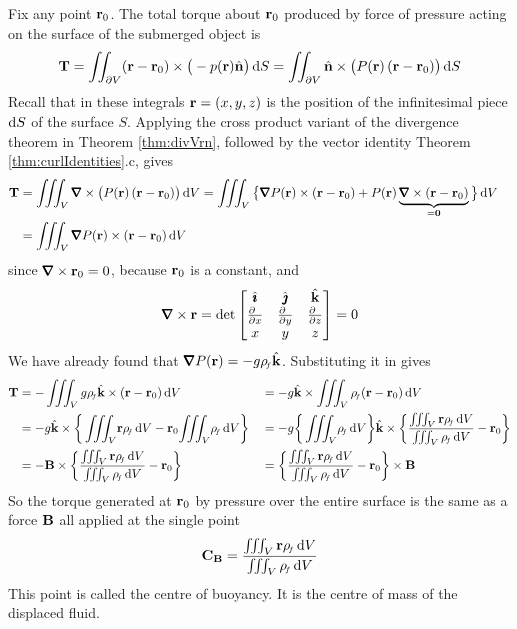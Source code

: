 Fix any point $\mathbf{r}_0$. The total torque about $\mathbf{r}_0$ produced by 
force of pressure acting on the surface of the submerged object is
\begin{equation*}
\mathbf{T}=\iint_{\partial V} (\mathbf{r}-\mathbf{r}_0)\times\big(-p(\mathbf{r})\hat{\mathbf{n}}\big)\,\mathrm{d}S
=\iint_{\partial V} \hat{\mathbf{n}}\times\big(P(\mathbf{r})\, (\mathbf{r}-\mathbf{r}_0)\big)\,\mathrm{d}S
\end{equation*}
Recall that in these integrals $\mathbf{r}=(x,y,z)$ is the position of the 
infinitesimal piece $\mathrm{d}S$ of the surface $S$.
Applying the cross product variant of the divergence theorem in Theorem
\ref{thm:divVrn}, followed by the vector identity 
Theorem \ref{thm:curlIdentities}.c, gives
\begin{align*}
\vT&=\tripInt_V \vnabla\times\big(P(\vr)\,(\vr-\vr_0)\big)\,\dee{V}
=\tripInt_V \big\{\vnabla P(\vr)\times(\vr-\vr_0)
     +P(\vr)\underbrace{\vnabla\times(\vr-\vr_0)}_{=\vZero}\big\}\,\dee{V}\cr
&=\tripInt_V \vnabla P(\vr)\times(\vr-\vr_0)\,\dee{V}
\end{align*}
since $\vnabla\times\vr_0=0$, because $\mathbf{r}_0$ is a constant, and
\begin{equation*}
\vnabla\times\vr=\det\left[\begin{matrix}
                   \hi&\hj&\hk\cr
                   \frac{\partial\hfill}{\partial x}&
                   \frac{\partial\hfill}{\partial y}&
                   \frac{\partial\hfill}{\partial z}\\
                   x&y&z
                  \end{matrix}\right] 
=0
\end{equation*}
We have already found that $\vnabla P(\vr)=-g\rhof\hk$.
Substituting it in gives
\begin{alignat*}{3}
\vT&=-\tripInt_V g\rhof\hk\times(\vr-\vr_0)\,\dee{V}
&&=-g\hk\times\tripInt_V \rhof (\vr-\vr_0)\,\dee{V}\\
&=-g\hk\times\bigg\{\tripInt_V\! \vr\rhof\,\dee{V}
                 -\vr_0\!\tripInt_V\! \rhof\,\dee{V}\bigg\}
&&=-g\bigg\{\tripInt_V\! \rhof\,\dee{V}\bigg\}\hk\times \bigg\{
     \frac{\tripInt_V \vr\rhof\,\dee{V}}{\tripInt_V\rhof\,
                     \dee{V}}-\vr_0\bigg\}\\
&=-\vB\times\bigg\{\frac{\tripInt_V \vr\rhof\,\dee{V}}
                        {\tripInt_V\rhof\,\dee{V}}-\vr_0\bigg\}
&&=\bigg\{\frac{\tripInt_V \vr\rhof\,\dee{V}}
            {\tripInt_V\rhof\,\dee{V}}-\vr_0\bigg\}\times\vB
\end{alignat*}
So the torque generated at $\mathbf{r}_0$ by pressure over the entire surface
is the same as a force $\mathbf{B}$ all applied at the single point
\begin{equation*}
\mathbf{C}_{\mathbf{B}}=\frac{\iiint_V \mathbf{r}{\rho_{\!{\scriptscriptstyle f}}}\,\mathrm{d}V}{\iiint_V{\rho_{\!{\scriptscriptstyle f}}}\,\mathrm{d}V}
\end{equation*}
This point is called the centre of buoyancy. It is the centre of mass
of the displaced fluid. 


